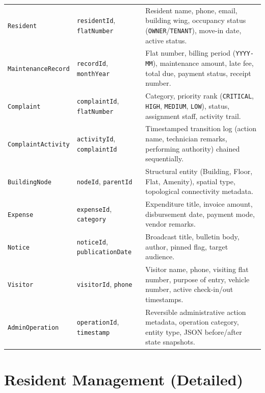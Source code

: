 \documentclass[12pt,a4paper]{article}
\begin{document}
\begin{xltabular}{\textwidth}{l p{4.2cm} X}
\texttt{Resident} & \texttt{residentId}, \texttt{flatNumber} & Resident name, phone, email, building wing, occupancy status (\texttt{OWNER}/\texttt{TENANT}), move-in date, active status. \\
\texttt{MaintenanceRecord} & \texttt{recordId}, \texttt{monthYear} & Flat number, billing period (\texttt{YYYY-MM}), maintenance amount, late fee, total due, payment status, receipt number. \\
\texttt{Complaint} & \texttt{complaintId}, \texttt{flatNumber} & Category, priority rank (\texttt{CRITICAL}, \texttt{HIGH}, \texttt{MEDIUM}, \texttt{LOW}), status, assignment staff, activity trail. \\
\texttt{ComplaintActivity} & \texttt{activityId}, \texttt{complaintId} & Timestamped transition log (action name, technician remarks, performing authority) chained sequentially. \\
\texttt{BuildingNode} & \texttt{nodeId}, \texttt{parentId} & Structural entity (Building, Floor, Flat, Amenity), spatial type, topological connectivity metadata. \\
\texttt{Expense} & \texttt{expenseId}, \texttt{category} & Expenditure title, invoice amount, disbursement date, payment mode, vendor remarks. \\
\texttt{Notice} & \texttt{noticeId}, \texttt{publicationDate} & Broadcast title, bulletin body, author, pinned flag, target audience. \\
\texttt{Visitor} & \texttt{visitorId}, \texttt{phone} & Visitor name, phone, visiting flat number, purpose of entry, vehicle number, active check-in/out timestamps. \\
\texttt{AdminOperation} & \texttt{operationId}, \texttt{timestamp} & Reversible administrative action metadata, operation category, entity type, JSON before/after state snapshots. \\
\end{xltabular}

\section{Resident Management (Detailed)}
\end{document}
